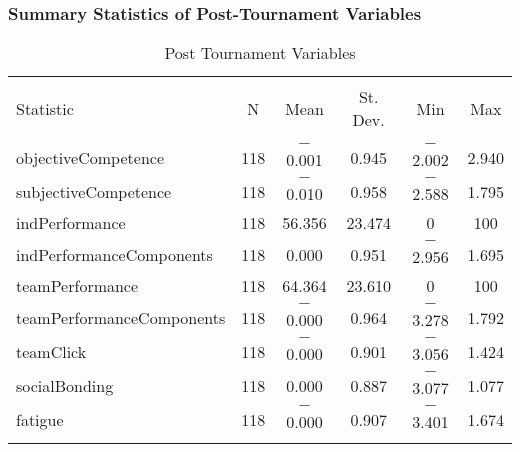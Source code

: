 \documentclass[12pt]{report}
\begin{document}
\begin{landscape}

\subsubsection{Summary Statistics of Post-Tournament Variables}


\begin{table}[!htbp] \centering
  \caption{Post Tournament Variables }
  \label{}
\footnotesize
\begin{tabular}{@{\extracolsep{5pt}}lccccc}
\\[-1.8ex]\hline
\hline \\[-1.8ex]
Statistic & \multicolumn{1}{c}{N} & \multicolumn{1}{c}{Mean} & \multicolumn{1}{c}{St. Dev.} & \multicolumn{1}{c}{Min} & \multicolumn{1}{c}{Max} \\
\hline \\[-1.8ex]
objectiveCompetence & 118 & $-$0.001 & 0.945 & $-$2.002 & 2.940 \\
subjectiveCompetence & 118 & $-$0.010 & 0.958 & $-$2.588 & 1.795 \\
indPerformance & 118 & 56.356 & 23.474 & 0 & 100 \\
indPerformanceComponents & 118 & 0.000 & 0.951 & $-$2.956 & 1.695 \\
teamPerformance & 118 & 64.364 & 23.610 & 0 & 100 \\
teamPerformanceComponents & 118 & $-$0.000 & 0.964 & $-$3.278 & 1.792 \\
teamClick& 118 & $-$0.000 & 0.901 & $-$3.056 & 1.424 \\
socialBonding & 118 & 0.000 & 0.887 & $-$3.077 & 1.077 \\
fatigue & 118 & $-$0.000 & 0.907 & $-$3.401 & 1.674 \\
\hline \\[-1.8ex]
\end{tabular}
\end{table}



\end{landscape}
\end{document}

